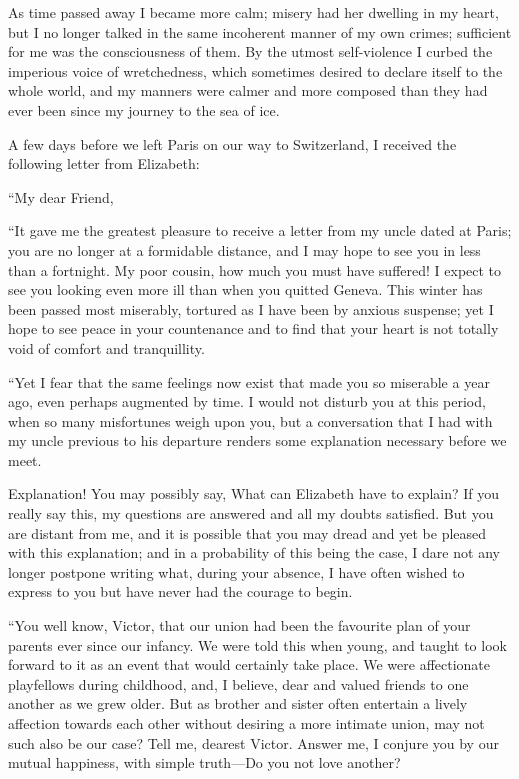 \documentclass[12pt,openright]{book}
\begin{document}
As time passed away I became more calm; misery had her dwelling in my heart, but I no longer talked in the same incoherent manner of my own crimes; sufficient for me was the consciousness of them. By the utmost self-violence I curbed the imperious voice of wretchedness, which sometimes desired to declare itself to the whole world, and my manners were calmer and more composed than they had ever been since my journey to the sea of ice.

A few days before we left Paris on our way to Switzerland, I received the following letter from Elizabeth:

“My dear Friend,

“It gave me the greatest pleasure to receive a letter from my uncle dated at Paris; you are no longer at a formidable distance, and I may hope to see you in less than a fortnight. My poor cousin, how much you must have suffered! I expect to see you looking even more ill than when you quitted Geneva. This winter has been passed most miserably, tortured as I have been by anxious suspense; yet I hope to see peace in your countenance and to find that your heart is not totally void of comfort and tranquillity.

“Yet I fear that the same feelings now exist that made you so miserable a year ago, even perhaps augmented by time. I would not disturb you at this period, when so many misfortunes weigh upon you, but a conversation that I had with my uncle previous to his departure renders some explanation necessary before we meet.

Explanation! You may possibly say, What can Elizabeth have to explain? If you really say this, my questions are answered and all my doubts satisfied. But you are distant from me, and it is possible that you may dread and yet be pleased with this explanation; and in a probability of this being the case, I dare not any longer postpone writing what, during your absence, I have often wished to express to you but have never had the courage to begin.

“You well know, Victor, that our union had been the favourite plan of your parents ever since our infancy. We were told this when young, and taught to look forward to it as an event that would certainly take place. We were affectionate playfellows during childhood, and, I believe, dear and valued friends to one another as we grew older. But as brother and sister often entertain a lively affection towards each other without desiring a more intimate union, may not such also be our case? Tell me, dearest Victor. Answer me, I conjure you by our mutual happiness, with simple truth—Do you not love another?
\end{document}
